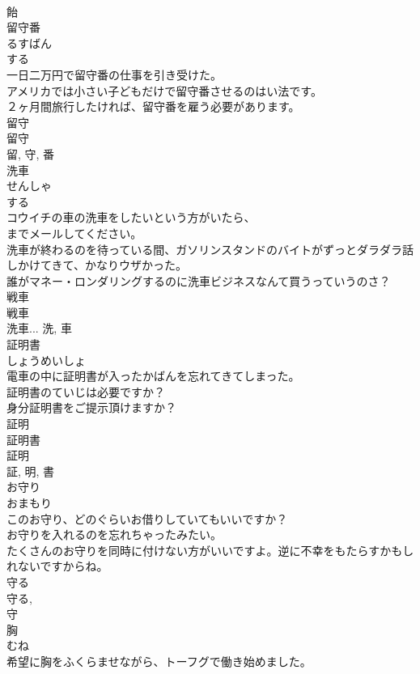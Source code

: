 \documentclass[8pt]{extreport}
\begin{document}
\begin{CJK}{UTF8}{min}
\\	飴	
\\	留守番	
\\	るすばん	
\\	する 
\\	一日二万円で留守番の仕事を引き受けた。	
\\	アメリカでは小さい子どもだけで留守番させるのはい法です。	
\\	２ヶ月間旅行したければ、留守番を雇う必要があります。	
\\	留守 
\\	留守 
\\	留, 守, 番	
\\	洗車	
\\	せんしゃ	
\\	する 
\\	コウイチの車の洗車をしたいという方がいたら、
\\	までメールしてください。	
\\	洗車が終わるのを待っている間、ガソリンスタンドのバイトがずっとダラダラ話しかけてきて、かなりウザかった。	
\\	誰がマネー・ロンダリングするのに洗車ビジネスなんて買うっていうのさ？	
\\	戦車 
\\	戦車 
\\	洗車...	洗, 車	
\\	証明書	
\\	しょうめいしょ	
\\	電車の中に証明書が入ったかばんを忘れてきてしまった。	
\\	証明書のていじは必要ですか？	
\\	身分証明書をご提示頂けますか？	
\\	証明 
\\	証明書 
\\	証明
\\	証, 明, 書	
\\	お守り	
\\	おまもり	
\\	このお守り、どのぐらいお借りしていてもいいですか？	
\\	お守りを入れるのを忘れちゃったみたい。	
\\	たくさんのお守りを同時に付けない方がいいですよ。逆に不幸をもたらすかもしれないですからね。	
\\	守る 
\\	守る, 
\\	守	
\\	胸	
\\	むね	
\\	希望に胸をふくらませながら、トーフグで働き始めました。	

\end{CJK}
\end{document}
